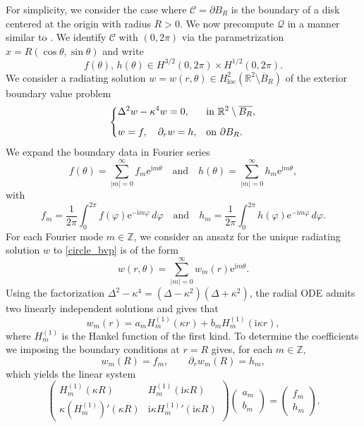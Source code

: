 \documentclass{article}
\begin{document}
For simplicity, we consider the case where $\mathcal C=\partial B_R$ is the boundary of a disk centered at the origin with radius $R>0$. We now precompute $\mathcal Q$ in a manner similar to \cite{HarrisNyugens2022}. We identify $\mathcal C$ with $(0,2\pi)$ via the parametrization $x=R(\cos\theta,\sin\theta)$ and write
\[
f(\theta),\, h(\theta)\in H^{3/2}(0,2\pi)\times H^{1/2}(0,2\pi).
\]
{We consider a radiating solution $w=w(r,\theta)\in H_{\text{loc}}^2(\mathbb R^2\setminus \overline B_R)$ of the exterior boundary value problem
\begin{align}\label{circle_bvp}
\begin{dcases}
\Delta^2w-\kappa^4w=0, & \text{in }\mathbb R^2\setminus\overline{B_R},\\[2mm]
w=f,\quad \partial_r w=h, & \text{on }\partial B_R.
\end{dcases}
\end{align}}
We expand the boundary data in Fourier series
\[
f(\theta)=\sum_{|m|=0}^\infty f_m \mathrm e^{\mathrm im\theta}
\quad \text{and} \quad
h(\theta)=\sum_{|m|=0}^{\infty} h_m \mathrm e^{\mathrm im\theta},
\]
with
\[
f_m=\frac{1}{2\pi}\int_0^{2\pi} f(\varphi)\mathrm e^{-\mathrm im\varphi}\,d\varphi
\quad\text{and}\quad
h_m=\frac{1}{2\pi}\int_0^{2\pi} h(\varphi)\mathrm e^{-\mathrm im\varphi}\,d\varphi.
\]
For each Fourier mode $m\in\mathbb Z$, we consider an ansatz for the unique radiating solution $w$ to \eqref{circle_bvp} is of the form
\[
w(r,\theta)=\sum_{|m|=0}^\infty w_m(r)\mathrm e^{\mathrm im\theta}.
\]
Using the factorization $\Delta^2-\kappa^4=(\Delta-\kappa^2)(\Delta+\kappa^2)$, the radial ODE admits two linearly independent solutions and gives that 
\[
w_m(r)=a_m H_m^{(1)}(\kappa r)+b_m H_m^{(1)}(\mathrm i\kappa r),
\]
where $H_m^{(1)}$ is the Hankel function of the first kind. To determine the coefficients we imposing the boundary conditions at $r=R$ gives, for each $m\in\mathbb Z$,
\[
w_m(R)=f_m,
\qquad
\partial_r w_m(R)=h_m,
\]
which yields the linear system
\[
\begin{pmatrix}
H_m^{(1)}(\kappa R) & H_m^{(1)}(\mathrm i\kappa R)\\[1ex]
\kappa (H_m^{(1)})'(\kappa R) &
\mathrm i\kappa {H_m^{(1)}}'(\mathrm i\kappa R)
\end{pmatrix}
\begin{pmatrix}
a_m\\
b_m
\end{pmatrix}
=
\begin{pmatrix}
f_m\\
h_m
\end{pmatrix}.
\]
\end{document}
